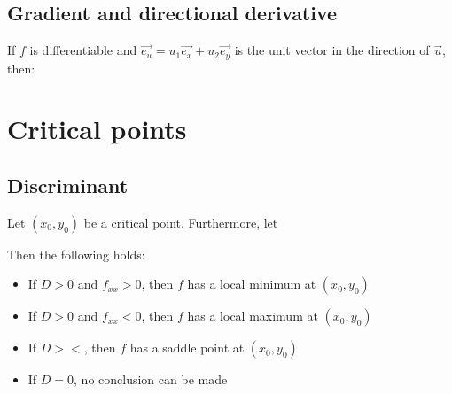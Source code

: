 \documentclass{article}
\begin{document}
\subsection{Gradient and directional derivative}
If $f$ is differentiable and $\overrightarrow{e_u} = u_1\overrightarrow{e_x} + u_2\overrightarrow{e_y}$
is the unit vector in the direction of $\overrightarrow{u}$, then:

\section{Critical points}
\subsection{Discriminant}
Let $(x_0,y_0)$ be a critical point. Furthermore, let

Then the following holds:
\begin{itemize}
    \item If $D>0$ and $f_{xx}>0$, then $f$ has a local minimum at $(x_0,y_0)$
    \item If $D>0$ and $f_{xx}<0$, then $f$ has a local maximum at $(x_0,y_0)$
    \item If $D><$, then $f$ has a saddle point at $(x_0,y_0)$
    \item If $D=0$, no conclusion can be made
\end{itemize}
\end{document}

